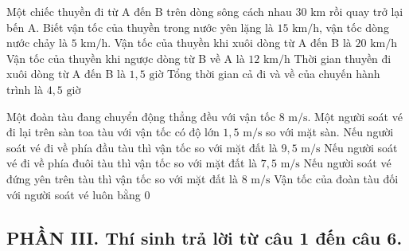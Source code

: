\begin{ex}
Một chiếc thuyền đi từ A đến B trên dòng sông cách nhau $30\text{ km}$ rồi quay trở lại bến A. Biết vận tốc của thuyền trong nước yên lặng là $15\text{ km/h}$, vận tốc dòng nước chảy là $5\text{ km/h}$.
\choiceTF
{\True Vận tốc của thuyền khi xuôi dòng từ A đến B là $20\text{ km/h}$}
{Vận tốc của thuyền khi ngược dòng từ B về A là $12\text{ km/h}$}
{\True Thời gian thuyền đi xuôi dòng từ A đến B là $1{,}5\text{ giờ}$}
{\True Tổng thời gian cả đi và về của chuyến hành trình là $4{,}5\text{ giờ}$}
\end{ex}

\begin{ex}
Một đoàn tàu đang chuyển động thẳng đều với vận tốc $8\text{ m/s}$. Một người soát vé đi lại trên sàn toa tàu với vận tốc có độ lớn $1{,}5\text{ m/s}$ so với mặt sàn.
\choiceTF
{\True Nếu người soát vé đi về phía đầu tàu thì vận tốc so với mặt đất là $9{,}5\text{ m/s}$}
{Nếu người soát vé đi về phía đuôi tàu thì vận tốc so với mặt đất là $7{,}5\text{ m/s}$}
{\True Nếu người soát vé đứng yên trên tàu thì vận tốc so với mặt đất là $8\text{ m/s}$}
{Vận tốc của đoàn tàu đối với người soát vé luôn bằng $0$}
\end{ex}

\subsection*{PHẦN III. Thí sinh trả lời từ câu 1 đến câu 6.}

